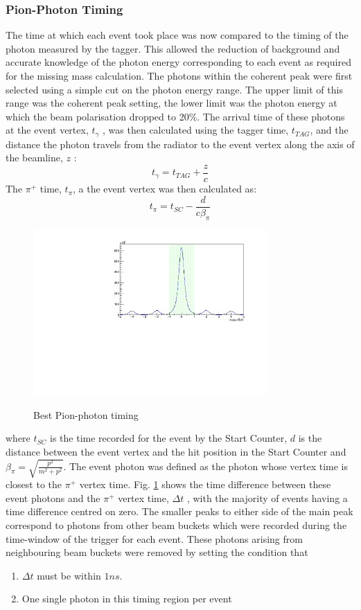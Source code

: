 \subsubsection{Pion-Photon Timing}
The time at which each event took place was now compared to the timing of the photon measured by the tagger. This allowed the reduction of background and accurate knowledge of the photon energy corresponding to each event as required for the missing mass calculation. The photons within the coherent peak were first selected using a simple cut on the photon energy range. The upper limit of this range was the coherent peak setting, the lower limit was the photon energy at which the beam polarisation dropped to 20\%. The arrival time of these photons at the event vertex, $t_\gamma$ , was then calculated using the tagger time, $t_{TAG}$, and the distance the photon travels from the radiator to the event vertex along the axis of the beamline, $z$ :
$$
t_\gamma = t_{TAG} + \frac{z}{c}
$$
The $\pi^+$ time, $t_\pi$, a the event vertex was then calculated as:
$$
t_\pi = t_{SC} - \frac{d}{c \beta_\pi}
$$
\begin{figure}[htb]
  \includegraphics[width=0.8\textwidth]{figures/best_pion_photon_timing.pdf} \\
  \caption{Best Pion-photon timing}
  \label{fig:pion-photontiming}
\end{figure}
where $t_{SC}$ is the time recorded for the event by the Start Counter, $d$ is the distance between the event vertex and the hit position in the Start Counter  and $\beta_\pi = \sqrt{\frac{p^2}{m^2 + p^2}} $.  The event photon was defined as the photon whose vertex time is closest to the $\pi^+$ vertex time. Fig. \ref{fig:pion-photontiming} shows the time difference between these event photons and the $\pi^+$ vertex time, $\Delta t$ , with the majority of events having a time difference centred on zero. The smaller peaks to either side of the main peak correspond to photons from other beam buckets which were recorded during the time-window of the trigger for each event. These photons arising from neighbouring beam buckets were removed by setting the condition that 
\begin{enumerate}
\item $\Delta t$ must be within $1 ns$. 
\item One single photon in this timing region per event
\end{enumerate}
